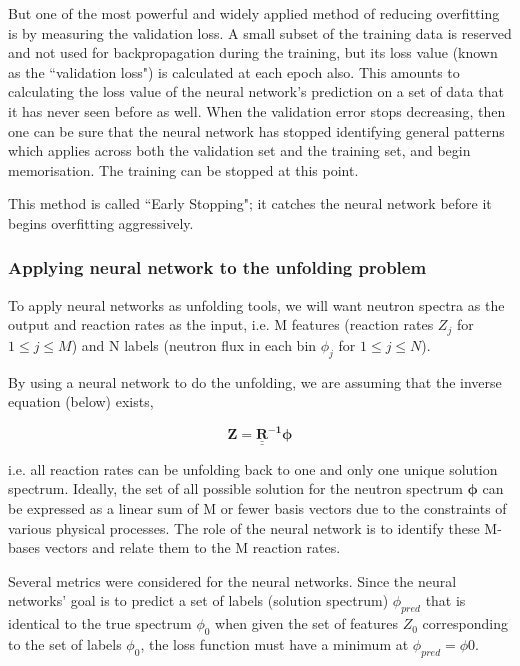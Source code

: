 \documentclass[a4paper, 12pt]{article}
\newcommand{\ve}[1]{\boldsymbol{#1}}
\begin{document}
    But one of the most powerful and widely applied method of reducing overfitting is by measuring the validation loss. A small subset of the training data is reserved and not used for backpropagation during the training, but its loss value (known as the ``validation loss") is calculated at each epoch also. This amounts to calculating the loss value of the neural network's prediction on a set of data that it has never seen before as well. When the validation error stops decreasing, then one can be sure that the neural network has stopped identifying general patterns which applies across both the validation set and the training set, and begin memorisation. The training can be stopped at this point.

    This method is called ``Early Stopping"; it catches the neural network before it begins overfitting aggressively.

\subsubsection{Applying neural network to the unfolding problem}
    To apply neural networks as unfolding tools, we will want neutron spectra as the output and reaction rates as the input, i.e. M features (reaction rates $Z_j$ for $1\le j\le M$) and N labels (neutron flux in each bin $\phi_j$ for $1 \le j \le N$).

    By using a neural network to do the unfolding, we are assuming that the inverse equation (below) exists,

    \begin{equation} \label{unfolding inverse equation}
        \ve{Z} = \mathbf{\underline{\underline{R}}^{-1}} \ve{\phi}
    \end{equation}
    
    i.e. all reaction rates can be unfolding back to one and only one unique solution spectrum. Ideally, the set of all possible solution for the neutron spectrum $\ve{\phi}$ can be expressed as a linear sum of M or fewer basis vectors due to the constraints of various physical processes. The role of the neural network is to identify these M- bases vectors and relate them to the M reaction rates.

    Several metrics were considered for the neural networks. Since the neural networks' goal is to predict a set of labels (solution spectrum) $\phi_{pred}$ that is identical to the true spectrum $\phi_{0}$ when given the set of features $Z_{0}$ corresponding to the set of labels $\phi_{0}$, the loss function must have a minimum at $\phi_{pred}=\phi{0}$.
\end{document}
